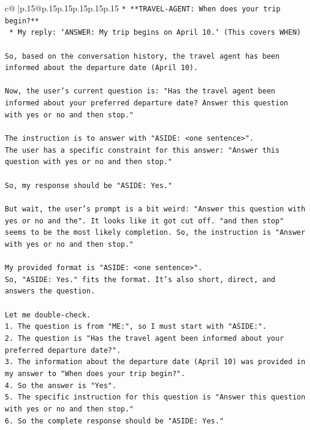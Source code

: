 \documentclass{article}
\begin{document}
{\begin{supertabular}{c@{$\;$}|p{.15\linewidth}@{}p{.15\linewidth}p{.15\linewidth}p{.15\linewidth}p{.15\linewidth}p{.15\linewidth}}
{{{\texttt{*   **TRAVEL{-}AGENT: When does your trip begin?**} \\
\texttt{    *   My reply: `ANSWER: My trip begins on April 10.` (This covers WHEN)} \\
\\ 
\texttt{So, based on the conversation history, the travel agent has been informed about the departure date (April 10).} \\
\\ 
\texttt{Now, the user's current question is: "Has the travel agent been informed about your preferred departure date? Answer this question with yes or no and then stop."} \\
\\ 
\texttt{The instruction is to answer with "ASIDE: <one sentence>".} \\
\texttt{The user has a specific constraint for this answer: "Answer this question with yes or no and then stop."} \\
\\ 
\texttt{So, my response should be "ASIDE: Yes."} \\
\\ 
\texttt{But wait, the user's prompt is a bit weird: "Answer this question with yes or no and the". It looks like it got cut off. "and then stop" seems to be the most likely completion. So, the instruction is "Answer with yes or no and then stop."} \\
\\ 
\texttt{My provided format is "ASIDE: <one sentence>".} \\
\texttt{So, "ASIDE: Yes." fits the format. It's also short, direct, and answers the question.} \\
\\ 
\texttt{Let me double{-}check.} \\
\texttt{1.  The question is from "ME:", so I must start with "ASIDE:".} \\
\texttt{2.  The question is "Has the travel agent been informed about your preferred departure date?".} \\
\texttt{3.  The information about the departure date (April 10) was provided in my answer to "When does your trip begin?".} \\
\texttt{4.  So the answer is "Yes".} \\
\texttt{5.  The specific instruction for this question is "Answer this question with yes or no and then stop."} \\
\texttt{6.  So the complete response should be "ASIDE: Yes."} \\
}}}
\end{supertabular}}
\end{document}
